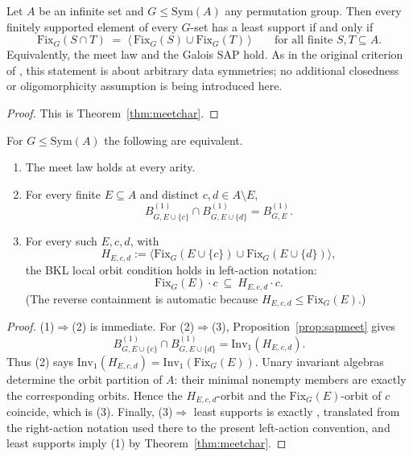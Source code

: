 \documentclass{lmcs}
\newcommand{\Sym}{\mathrm{Sym}}
\newcommand{\Fix}{\mathrm{Fix}}
\newcommand{\Inv}{\mathrm{Inv}}
\begin{document}
\begin{cor}\label{cor:criterion}
Let $A$ be an infinite set and $G\leq\Sym(A)$ any permutation group.
Then every finitely supported element of every $G$-set has a least
support if and only if
\begin{equation}\label{eq:sapcrit}
\Fix_G(S\cap T)\;=\;\bigl\langle\,\Fix_G(S)\cup\Fix_G(T)\,\bigr\rangle
\qquad\text{for all finite }S,T\subseteq A.
\end{equation}
Equivalently, the meet law and the Galois \textup{SAP} hold. As in the original criterion of \cite{BKL14}, this statement is about arbitrary data symmetries; no additional closedness or oligomorphicity assumption is being introduced here.
\end{cor}

\begin{proof}
This is Theorem~\ref{thm:meetchar}.
\end{proof}

\begin{cor}\label{cor:arityone}
For $G\leq\Sym(A)$ the following are equivalent.
\begin{enumerate}[label=\textup{(\arabic*)}]
\item The meet law holds at every arity.
\item For every finite $E\subseteq A$ and distinct $c,d\in A\setminus E$,
\[
B^{(1)}_{G,E\cup\{c\}}\cap B^{(1)}_{G,E\cup\{d\}}=B^{(1)}_{G,E}.
\]
\item For every such $E,c,d$, with
\[
H_{E,c,d}:=\bigl\langle\Fix_G(E\cup\{c\})\cup\Fix_G(E\cup\{d\})\bigr\rangle,
\]
the BKL local orbit condition holds in left-action notation:
\[
\Fix_G(E)\cdot c\ \subseteq\ H_{E,c,d}\cdot c.
\]
(The reverse containment is automatic because $H_{E,c,d}\leq\Fix_G(E)$.)
\end{enumerate}
\end{cor}
\begin{proof}
(1)$\Rightarrow$(2) is immediate. For (2)$\Rightarrow$(3), Proposition~\ref{prop:sapmeet} gives
\[
B^{(1)}_{G,E\cup\{c\}}\cap B^{(1)}_{G,E\cup\{d\}}=\Inv_1(H_{E,c,d}).
\]
Thus (2) says $\Inv_1(H_{E,c,d})=\Inv_1(\Fix_G(E))$. Unary invariant algebras determine the orbit partition of $A$: their minimal nonempty members are exactly the corresponding orbits. Hence the $H_{E,c,d}$-orbit and the $\Fix_G(E)$-orbit of $c$ coincide, which is (3). Finally, (3)$\Rightarrow$ least supports is exactly \cite[Thm.~9.3]{BKL14}, translated from the right-action notation used there to the present left-action convention, and least supports imply (1) by Theorem~\ref{thm:meetchar}.
\end{proof}
\end{document}
